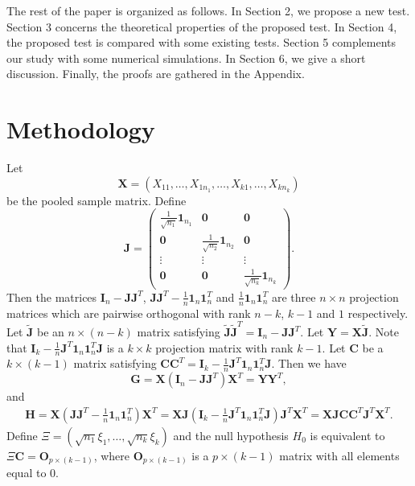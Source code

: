 \documentclass[12pt]{article} %
\newcommand{\bX}{\mathbf{X}}
\newcommand{\bY}{\mathbf{Y}}
\newcommand{\bH}{\mathbf{H}}
\newcommand{\bG}{\mathbf{G}}
\newcommand{\bJ}{\mathbf{J}}
\newcommand{\bC}{\mathbf{C}}
\newcommand{\bO}{\mathbf{O}}
\newcommand{\bI}{\mathbf{I}}
\theoremstyle{definition}
\begin{document}
    The rest of the paper is organized  as follows.
    In Section 2, we propose a new test. Section 3 concerns the theoretical properties of the proposed test. In Section 4, the proposed test is compared with some existing tests. Section 5 complements our study with some numerical simulations. In Section 6, we give a short discussion. Finally, the proofs are gathered in the Appendix.




 
\section{Methodology}\label{methodology}

 Let
 $$\bX=(X_{11},\ldots,X_{1n_1},\ldots,X_{k1},\ldots,X_{kn_k})$$
 be the pooled sample matrix.
 Define
 $$
 \bJ=\begin{pmatrix}
     \frac{1}{\sqrt{n_1}}\mathbf{1}_{n_1}&\mathbf{0} & \mathbf{0}\\
     \mathbf{0}&\frac{1}{\sqrt{n_2}} \mathbf{1}_{n_2}& \mathbf{0}\\
     \vdots &\vdots &\vdots \\
     \mathbf{0}&\mathbf{0}&\frac{1}{\sqrt{n_k}}\mathbf{1}_{n_k}
 \end{pmatrix}.
 $$
Then the matrices $\bI_n-\bJ\bJ^T$, $\bJ\bJ^T-\frac{1}{n}\mathbf{1}_n\mathbf{1}_n^T$ and $\frac{1}{n}\mathbf{1}_n\mathbf{1}_n^T$ are three $n\times n$ projection matrices which are pairwise orthogonal with rank $n-k$, $k-1$ and $1$ respectively.
Let $\tilde{\bJ}$ be an $n\times (n-k)$ matrix satisfying $\tilde{\bJ}\tilde{\bJ}^T =\bI_n-\bJ\bJ^T$.
Let $\bY=\bX\tilde{\bJ}$.
Note that $\bI_k-\frac{1}{n}\bJ^T\mathbf{1}_n \mathbf{1}_n^T \bJ$ is a $k\times k$ projection matrix with rank $k-1$.
Let $\bC$ be a $k\times (k-1)$ matrix satisfying $\bC\bC^T=\bI_k-\frac{1}{n}\bJ^T\mathbf{1}_n \mathbf{1}_n^T \bJ$.
Then we have
$$
\bG=\bX(\bI_n-\bJ\bJ^T)\bX^T=
\bY \bY^T,
$$
and
\begin{equation*}
    \begin{aligned}
        \bH=\bX(\bJ\bJ^T-\frac{1}{n}\mathbf{1}_n\mathbf{1}_n^T)\bX^T
=\bX \bJ(\bI_k-\frac{1}{n}\bJ^T\mathbf{1}_n \mathbf{1}_n^T \bJ)\bJ^T \bX^T
=\bX \bJ\bC \bC^T \bJ^T \bX^T.
    \end{aligned}
\end{equation*}
 Define $\Xi=(\sqrt{n_1}\xi_1,\ldots,\sqrt{n_k}\xi_k)$
 and the null hypothesis $H_0$ is equivalent to $\Xi \bC=\bO_{p\times (k-1)}$, where $\bO_{p\times (k-1)}$ is a $p\times (k-1)$ matrix with all elements equal to $0$.
\end{document}
